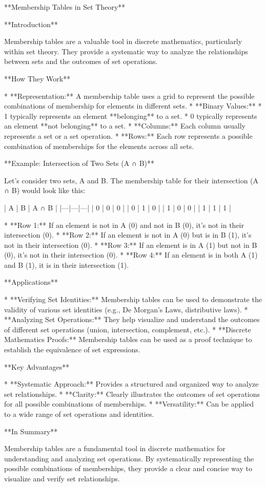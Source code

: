 **Membership Tables in Set Theory**

**Introduction**

Membership tables are a valuable tool in discrete mathematics, particularly within set theory. They provide a systematic way to analyze the relationships between sets and the outcomes of set operations.

**How They Work**

* **Representation:** A membership table uses a grid to represent the possible combinations of membership for elements in different sets. 
* **Binary Values:** 
    * 1 typically represents an element **belonging** to a set.
    * 0 typically represents an element **not belonging** to a set.
* **Columns:** Each column usually represents a set or a set operation.
* **Rows:** Each row represents a possible combination of memberships for the elements across all sets.

**Example: Intersection of Two Sets (A ∩ B)**

Let's consider two sets, A and B. The membership table for their intersection (A ∩ B) would look like this:

| A | B | A ∩ B |
|---|---|---|
| 0 | 0 | 0 | 
| 0 | 1 | 0 |
| 1 | 0 | 0 |
| 1 | 1 | 1 |

* **Row 1:** If an element is not in A (0) and not in B (0), it's not in their intersection (0).
* **Row 2:** If an element is not in A (0) but is in B (1), it's not in their intersection (0).
* **Row 3:** If an element is in A (1) but not in B (0), it's not in their intersection (0).
* **Row 4:** If an element is in both A (1) and B (1), it is in their intersection (1).

**Applications**

* **Verifying Set Identities:** Membership tables can be used to demonstrate the validity of various set identities (e.g., De Morgan's Laws, distributive laws).
* **Analyzing Set Operations:** They help visualize and understand the outcomes of different set operations (union, intersection, complement, etc.).
* **Discrete Mathematics Proofs:** Membership tables can be used as a proof technique to establish the equivalence of set expressions.

**Key Advantages**

* **Systematic Approach:** Provides a structured and organized way to analyze set relationships.
* **Clarity:** Clearly illustrates the outcomes of set operations for all possible combinations of memberships.
* **Versatility:** Can be applied to a wide range of set operations and identities.

**In Summary**

Membership tables are a fundamental tool in discrete mathematics for understanding and analyzing set operations. By systematically representing the possible combinations of memberships, they provide a clear and concise way to visualize and verify set relationships.
